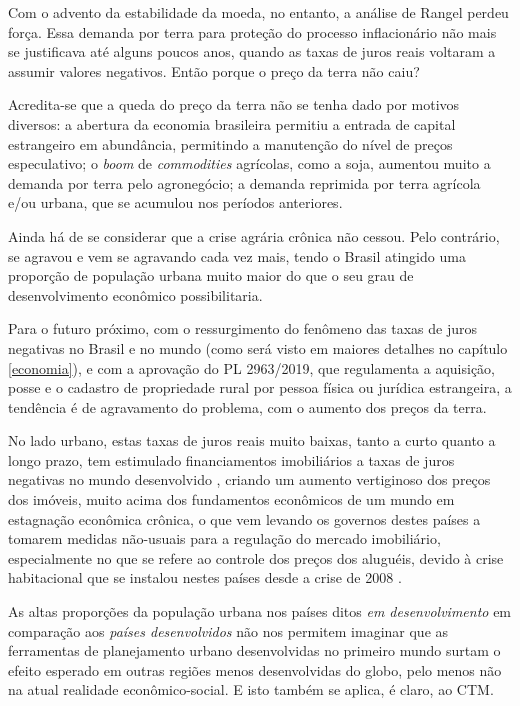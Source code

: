 \documentclass[
	12pt,				%
	oneside,			%
	a4paper,			%
	chapter=TITLE,		%
	section=TITLE,		%
	english,			%
	brazil				%
	]{abntex2}
\begin{document}
\begin{refsection}
Com o advento da estabilidade da moeda, no entanto, a análise de Rangel perdeu
força. Essa demanda por terra para proteção do processo inflacionário não mais
se justificava até alguns poucos anos, quando as taxas de juros reais voltaram
a assumir valores negativos. Então porque o preço da terra não caiu?

Acredita-se que a queda do preço da terra não se tenha dado por motivos diversos:
a abertura da economia brasileira permitiu a entrada de capital estrangeiro em
abundância, permitindo a manutenção do nível de preços especulativo; o \emph{boom} de
\emph{commodities} agrícolas, como a soja, aumentou muito a demanda por terra pelo
agronegócio; a demanda reprimida por terra agrícola e/ou urbana, que se acumulou
nos períodos anteriores.

Ainda há de se considerar que a crise agrária crônica não cessou. Pelo contrário,
se agravou e vem se agravando cada vez mais, tendo o Brasil atingido uma
proporção de população urbana muito maior do que o seu grau de desenvolvimento
econômico possibilitaria.

Para o futuro próximo, com o ressurgimento do fenômeno das taxas de
juros negativas no Brasil e no mundo (como será visto em maiores detalhes no
capítulo \ref{economia}), e com a aprovação do PL 2963/2019, que regulamenta
a aquisição, posse e o cadastro de propriedade rural por pessoa física ou
jurídica estrangeira, a tendência é de agravamento do problema, com o aumento
dos preços da terra.

No lado urbano, estas taxas de juros reais muito baixas, tanto a curto quanto a
longo prazo, tem estimulado financiamentos imobiliários a taxas de juros
negativas no mundo desenvolvido \autocite{serapicos}, criando um aumento vertiginoso dos
preços dos imóveis, muito acima dos fundamentos econômicos de um mundo em
estagnação econômica crônica, o que vem levando os governos destes países a
tomarem medidas não-usuais para a regulação do mercado imobiliário,
especialmente no que se refere ao controle dos preços dos aluguéis, devido à
crise habitacional que se instalou nestes países desde a crise de 2008 \autocites{berlim}{londres}{california}{suecia}{newzeland}{finlandia}.

As altas proporções da população urbana nos países ditos \emph{em desenvolvimento} em
comparação aos \emph{países desenvolvidos} não nos permitem imaginar que as
ferramentas de planejamento urbano desenvolvidas no primeiro mundo surtam o
efeito esperado em outras regiões menos desenvolvidas do globo, pelo menos não
na atual realidade econômico-social. E isto também se aplica, é claro, ao
\gls{CTM}.


\end{refsection}
\end{document}
